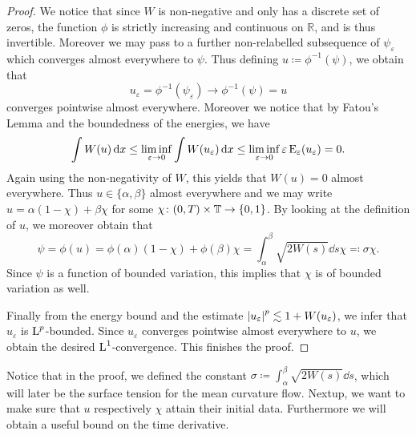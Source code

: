 \begin{proof}
	We notice that since $ W $ is non-negative and only has a discrete set of zeros, the function $ \phi $ is strictly increasing and continuous on $ \mathbb{ R } $, and is thus invertible. Moreover we may pass to a further non-relabelled subsequence of $ \psi_{ \varepsilon } $ which converges almost everywhere to $ \psi $. 
	Thus defining $ u \coloneqq \phi^{ - 1 } ( \psi ) $, we obtain that
	\begin{equation*}
		u_{ \varepsilon } = \phi^{ - 1 } ( \psi_{ \varepsilon } ) \to \phi^{ - 1 } ( \psi ) = u
	\end{equation*}
	converges pointwise almost everywhere.
	Moreover we notice that by Fatou's Lemma and the boundedness of the 
	energies, we have
	\begin{equation*}
		\int
		W ( u ) 
		\dd{ x }
		\leq
		\liminf_{ \varepsilon \to 0 }
		\int
		W ( u_{ \varepsilon } )
		\dd{ x }
		\leq
		\liminf_{ \varepsilon \to 0 }
		\varepsilon \operatorname{E}_{ \varepsilon } ( u_{ \varepsilon } )
		=
		0.
	\end{equation*}
	Again using the non-negativity of $ W $, this yields that $ W ( u ) = 0 $ almost everywhere. 
	Thus $ u \in \{ \alpha , \beta \} $ almost everywhere and we may write $ u = \alpha ( 1 - \chi ) + \beta \chi $ for some $ \chi \colon ( 0 , T ) \times \operatorname{\mathbb{T}} \to \{ 0 , 1 \} $.
	By looking at the definition of $ u $, we moreover obtain that 
	\begin{equation}
		\label{represenation_of_psi}
		\psi = \phi ( u ) = 
		\phi ( \alpha ) ( 1 - \chi )
		+ 
		\phi ( \beta )	\chi
		= 
		\int_{ \alpha }^{ \beta } \sqrt{ 2 W ( s ) } \dd{ s } \chi 
		\eqqcolon
		\sigma \chi.
	\end{equation}
	Since $ \psi $ is a function of bounded variation, this implies that $ \chi 
	$ is of bounded variation as well.
	
	Finally from the energy bound and the estimate $ \abs{ u_{ \varepsilon } 
	}^{ p } \lesssim 1 + W ( u_{ \varepsilon } ) $, we infer that $ u_{ 
	\varepsilon } $ is $ 
	\operatorname{L}^{ p }$-bounded. Since $ u_{ \varepsilon } $ converges pointwise 
	almost everywhere to $ u $, we obtain the desired $ \operatorname{L}^{ 1 } $-convergence.
	This finishes the proof.
\end{proof}

Notice that in the proof, we defined the constant $ \sigma \coloneqq \int_{ 
\alpha }^{ \beta } \sqrt{ 2 W ( s ) } \dd{ s } $, which will later be the 
surface tension for the mean curvature flow.
Nextup, we want to make sure that $ u $ respectively $ \chi $ attain their 
initial data.
Furthermore we will obtain a useful bound on the time derivative.

